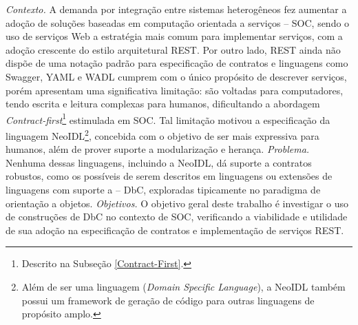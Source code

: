 
\vspace{5mm}

 
\vspace{5mm} 






\emph{Contexto.}
A demanda por integração entre sistemas heterogêneos fez aumentar a adoção de
soluções baseadas em computação orientada a serviços -- SOC, sendo o uso de
serviços Web a estratégia mais comum para implementar serviços, com a adoção crescente do estilo arquitetural REST.
Por outro lado, REST ainda não dispõe de uma notação padrão para especificação
de contratos e linguagens como Swagger, YAML e WADL cumprem com o
único propósito de descrever serviços, porém apresentam uma significativa
limitação: são voltadas para computadores, tendo escrita e leitura complexas para
humanos, dificultando a abordagem \textit{Contract-first}\footnote{Descrito
na Subseção \ref{Contract-First}.} estimulada em SOC. Tal limitação
motivou a especificação da linguagem NeoIDL\footnote{Além de ser uma linguagem (\textit{Domain Specific
Language}), a NeoIDL também possui um framework de geração de código para outras linguagens de propósito
amplo.}, concebida com o objetivo de ser mais expressiva para humanos,
além de prover suporte a modula\-ri\-za\-ção e herança.
\emph{Problema.} Nenhuma dessas linguagens, incluindo a NeoIDL, dá
suporte a contratos robustos, como os possíveis de serem descritos em
linguagens ou extensões de linguagens com suporte a \designbycontract{} -- DbC,
exploradas tipicamente no paradigma de orientação a objetos.
\emph{Objetivos.}
O objetivo geral deste trabalho é investigar o uso de construções de
DbC no contexto de SOC,
verificando a viabilidade e utilidade de sua adoção na especificação de
contratos e implementação de serviços REST.
%
